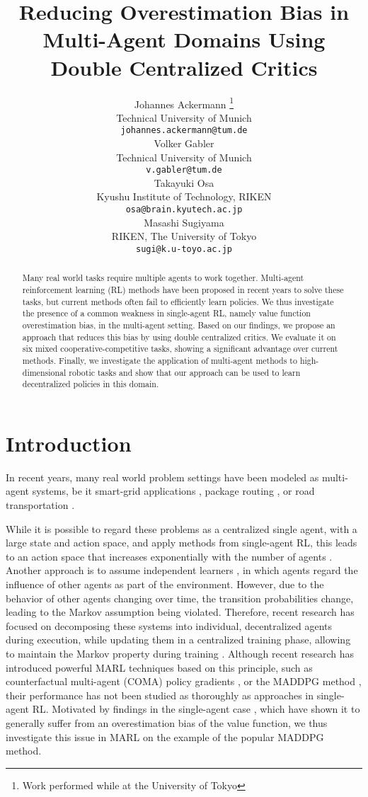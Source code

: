 \documentclass{article}
\title{Reducing Overestimation Bias in Multi-Agent Domains Using Double Centralized Critics}
\author{Johannes Ackermann \thanks{Work performed while at the University of Tokyo} \\
  Technical University of Munich\\
  \texttt{johannes.ackermann@tum.de} \\
\And
   Volker Gabler \\
  Technical University of Munich\\
  \texttt{v.gabler@tum.de} \\
   \AND
   Takayuki Osa \\
   Kyushu Institute of Technology, RIKEN\\
  \texttt{osa@brain.kyutech.ac.jp} \\
   \And
   Masashi Sugiyama \\
   RIKEN, The University of Tokyo \\
  \texttt{sugi@k.u-toyo.ac.jp}
}
\begin{document}
\maketitle

\begin{abstract}
	Many real world tasks require multiple agents to work together.
	Multi-agent reinforcement learning (RL) methods have been proposed in recent years to solve these tasks, but current methods often fail to efficiently learn policies.
	We thus investigate the presence of a common weakness in single-agent RL, namely value function overestimation bias, in the multi-agent setting.
	Based on our findings, we propose an approach that reduces this bias by using double centralized critics.
	We evaluate it on six mixed cooperative-competitive tasks, showing a significant advantage over current methods.
	Finally, we investigate the application of multi-agent methods to high-dimensional robotic tasks and show that our approach can be used to learn decentralized policies in this domain.
\end{abstract}


\section{Introduction}

In recent years, many real world problem settings have been modeled as multi-agent systems, be it smart-grid applications \cite{Li2012}, package routing \cite{Ye2015}, or road transportation \cite{Adler2002}.

While it is possible to regard these problems as a centralized single agent, with a large state and action space, and apply methods from single-agent \gls*{RL}, this leads to an action space that increases exponentially with the number of agents \cite{Mehta2005}.
Another approach is to assume independent learners \cite{Tan1993}, in which agents regard the influence of other agents as part of the environment.
However, due to the behavior of other agents changing over time, 
the transition probabilities change, 
leading to the Markov assumption being violated.
Therefore, recent research has focused on decomposing these systems into individual, decentralized agents during execution, while updating them in a centralized training phase, allowing to maintain the Markov property during training \cite{Oliehoek2008}.
Although recent research has introduced powerful \gls*{MARL} techniques based on this principle, such as counterfactual multi-agent (COMA) policy gradients \cite{Foerster2017}, or the \gls*{MADDPG} method \cite{Lowe2017}, their performance has not been studied as thoroughly as approaches in single-agent \gls*{RL}.
Motivated by findings in the single-agent case \cite{VanHasselt2015,Fujimoto2018}, which have shown it to generally suffer from an overestimation bias of the value function, we thus investigate this issue in \gls*{MARL} on the example of the popular \gls*{MADDPG} method.
\end{document}
